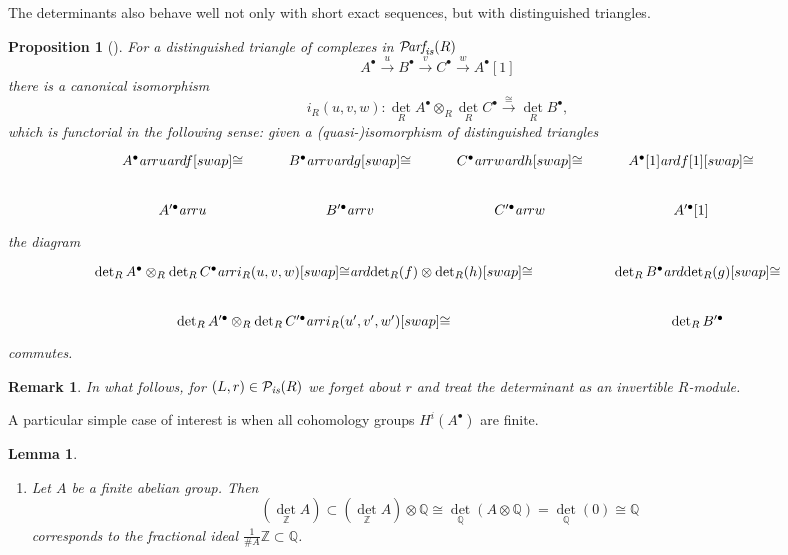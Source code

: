 \documentclass[10pt,a4paper,oneside,draft]{article}
\newcommand{\QQ}{\mathbb{Q}}
\newcommand{\ZZ}{\mathbb{Z}}
\newcommand{\Parf}{\mathcal{P}\!\text{\it arf}}
\renewcommand{\det}{\operatorname{det}}
\newcommand{\ar}{\text{\it ar}}
\newcommand{\is}{\text{\it is}}
\theoremstyle{myplain}
\newtheorem{proposition}[theorem]{Proposition}
\newtheorem{lemma}[theorem]{Lemma}
\theoremstyle{mydefinition}
\newtheorem{remark}[theorem]{Remark}
\numberwithin{equation}{section}
\begin{document}
\begin{appendices}
The determinants also behave well not only with short exact sequences, but with
distinguished triangles.

\begin{proposition}[{\cite[Proposition~7]{Knudsen-Mumford-1976}}]
  \label{prop:det-and-isos-of-triangles}
  For a distinguished triangle of complexes in $\Parf_\is (R)$
  \[ A^\bullet \xrightarrow{u} B^\bullet \xrightarrow{v} C^\bullet
    \xrightarrow{w} A^\bullet [1] \]
  there is a canonical isomorphism
  \[ i_R (u,v,w)\colon \det_R A^\bullet \otimes_R \det_R C^\bullet
    \xrightarrow{\cong} \det_R B^\bullet, \]
  which is functorial in the following sense: given a (quasi-)isomorphism of
  distinguished triangles
  \[ \begin{tikzcd}
      A^\bullet \ar{r}{u}\ar{d}{f}[swap]{\cong} & B^\bullet \ar{r}{v}\ar{d}{g}[swap]{\cong} & C^\bullet \ar{r}{w}\ar{d}{h}[swap]{\cong} & A^\bullet [1]\ar{d}{f[1]}[swap]{\cong} \\
      A'^\bullet \ar{r}{u} & B'^\bullet \ar{r}{v} & C'^\bullet \ar{r}{w} & A'^\bullet [1]
    \end{tikzcd} \]
  the diagram
  \[ \begin{tikzcd}[column sep=5em]
      \det_R A^\bullet \otimes_R \det_R C^\bullet \ar{r}{i_R (u,v,w)}[swap]{\cong}\ar{d}{\det_R (f) \otimes \det_R (h)}[swap]{\cong} & \det_R B^\bullet\ar{d}{\det_R (g)}[swap]{\cong} \\
      \det_R A'^\bullet \otimes_R \det_R C'^\bullet \ar{r}{i_R (u',v',w')}[swap]{\cong} & \det_R B'^\bullet
    \end{tikzcd} \]
  commutes.
\end{proposition}

\begin{remark}
  In what follows, for $(L,r) \in \mathcal{P}_\is (R)$ we forget about $r$ and
  treat the determinant as an invertible $R$-module.
\end{remark}

A particular simple case of interest is when all cohomology groups
$H^i (A^\bullet)$ are finite.

\begin{lemma}
  \label{lemma:determinant-for-torsion-cohomology}
  ~

  \begin{enumerate}
  \item[1)] Let $A$ be a finite abelian group. Then
    \[ (\det_\ZZ A) \subset (\det_\ZZ A) \otimes \QQ
      \cong \det_\QQ (A \otimes \QQ) = \det_\QQ (0) \cong \QQ \]
    corresponds to the fractional ideal $\frac{1}{\# A} \ZZ \subset \QQ$.


\end{enumerate}
\end{lemma}
\end{appendices}
\end{document}
